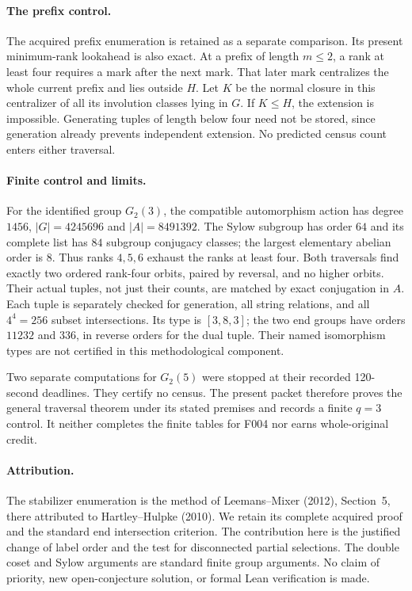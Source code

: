 \documentclass[11pt,a4paper]{article}
\begin{document}
\paragraph{The prefix control.}
The acquired prefix enumeration is retained as a separate comparison.
Its present minimum-rank lookahead is also exact. At a prefix of length
$m\leq2$, a rank at least four requires a mark after the next mark.
That later mark centralizes the whole current prefix and lies outside
$H$. Let $K$ be the normal closure in this centralizer of all its
involution classes lying in $G$. If $K\leq H$, the extension is
impossible. Generating tuples of length below four need not be stored,
since generation already prevents independent extension. No predicted
census count enters either traversal.

\paragraph{Finite control and limits.}
For the identified group $G_2(3)$, the compatible automorphism action
has degree $1456$, $|G|=4245696$ and $|A|=8491392$. The Sylow subgroup
has order $64$ and its complete list has $84$ subgroup conjugacy
classes; the largest elementary abelian order is $8$. Thus ranks
$4,5,6$ exhaust the ranks at least four. Both traversals find exactly
two ordered rank-four orbits, paired by reversal, and no higher
orbits. Their actual tuples, not just their counts, are matched by
exact conjugation in $A$. Each tuple is separately checked for
generation, all string relations, and all $4^4=256$ subset
intersections. Its type is $[3,8,3]$; the two end groups have orders
$11232$ and $336$, in reverse orders for the dual tuple. Their named
isomorphism types are not certified in this methodological component.

Two separate computations for $G_2(5)$ were stopped at their recorded
120-second deadlines. They certify no census. The present packet
therefore proves the general traversal theorem under its stated
premises and records a finite $q=3$ control. It neither completes the
finite tables for F004 nor earns whole-original credit.

\paragraph{Attribution.}
The stabilizer enumeration is the method of Leemans--Mixer (2012),
Section~5, there attributed to Hartley--Hulpke (2010). We retain its
complete acquired proof and the standard end intersection criterion.
The contribution here is the justified change of label order and the
test for disconnected partial selections. The double coset and Sylow
arguments are standard finite group arguments. No claim of priority,
new open-conjecture solution, or formal Lean verification is made.
\end{document}
